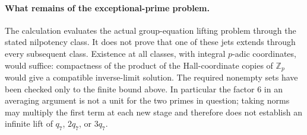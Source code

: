\paragraph{What remains of the exceptional-prime problem.}
The calculation evaluates the actual group-equation lifting
problem through the stated nilpotency class. It does not prove
that one of these jets extends through every subsequent class.
Existence at all classes, with integral $p$-adic coordinates,
would suffice: compactness of the product of the Hall-coordinate
copies of $\mathbb Z_p$ would give a compatible inverse-limit
solution. The required nonempty sets have been checked only to
the finite bound above. In particular the factor $6$ in an
averaging argument is not a unit for the two primes in question;
taking norms may multiply the first term at each new stage and
therefore does not establish an infinite lift of $q_7$, $2q_7$,
or $3q_7$.
